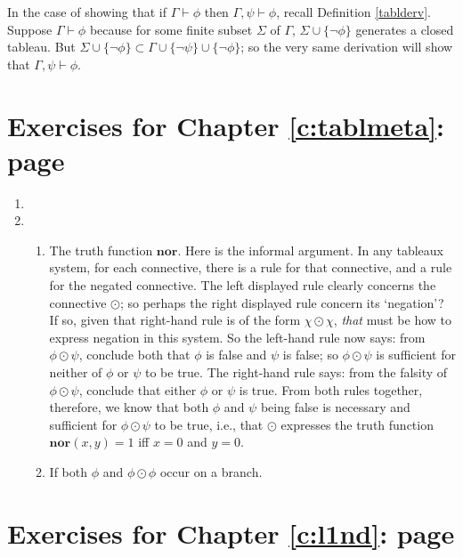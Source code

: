 {\begin{enumerate}
In the case of showing that if $\Gamma\vdash \phi$ then $\Gamma, \psi\vdash \phi$, recall Definition \ref{tablderv}. Suppose $\Gamma\vdash \phi$ because for some finite subset $\Sigma$ of $\Gamma$, $\Sigma\cup\{¬\phi\}$ generates a closed tableau. But $\Sigma\cup\{¬\phi\}\subset \Gamma\cup\{¬\psi\}\cup\{¬\phi\}$; so the very same derivation will show that $\Gamma, \psi\vdash \phi$. \setcounter{enumi}{5}

\end{enumerate}

\section*{Exercises for Chapter \ref{c:tablmeta}: page \pageref{ex6a}} \label{ans6a}

{\small
\begin{enumerate}
\item 
\item \begin{enumerate}
	\item The truth function $\mathbf{nor}$. Here is the informal argument. In any tableaux system, for each connective, there is a rule for that connective, and a rule for the negated connective. The left displayed rule clearly concerns the connective $\odot$; so perhaps the right displayed rule concern its `negation'? If so, given that right-hand rule is of the form $\chi\odot\chi$, \emph{that} must be how to express negation in this system. So the left-hand rule now says: from $\phi\odot\psi$, conclude both that $\phi$ is false and $\psi $ is false; so $\phi\odot\psi$ is sufficient for neither of $\phi$ or $\psi$ to be true. The right-hand rule says: from the falsity of $\phi\odot\psi$, conclude that either $\phi$ or $\psi$ is true. From both rules together, therefore, we know that both $\phi$ and $\psi$ being false is necessary and sufficient for $\phi\odot\psi$ to be true, i.e., that $\odot$ expresses the truth function $\mathbf{nor}(x,y) = 1$ iff $x=0$ and $y=0$. 

\item If both $\phi$ and $\phi\odot\phi$ occur on a branch.
\end{enumerate}
\end{enumerate}

}

\section*{Exercises for Chapter \ref{c:l1nd}: page \pageref{ex6b}} \label{ans6b}

}

